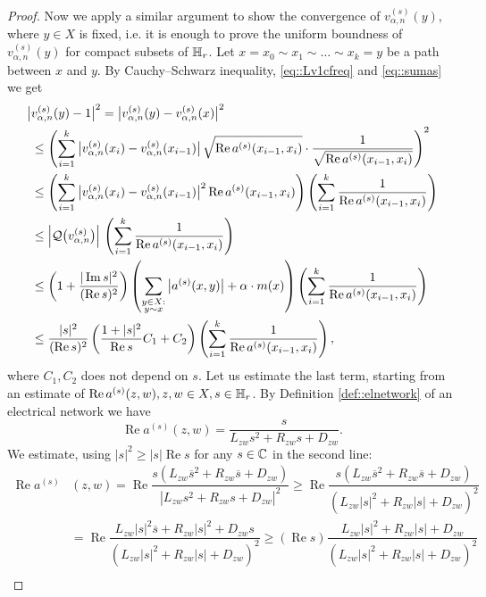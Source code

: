 \documentclass[a4paper,11pt]{amsart}
\theoremstyle{definition}
\renewcommand{\a}{a}%
\renewcommand{\Re}{\operatorname{Re}}%
\renewcommand{\Im}{\operatorname{Im}}%
\newcommand{\Q}{\mathcal{Q}}
\newcommand{\cfreq}{s}
\begin{document}
\begin{proof}
Now we  apply a similar argument to show the convergence of $v_{\alpha,n}^{(\cfreq)}(y)$, where $y\in X$ is fixed, i.e. it is enough to prove the uniform boundness of  $v_{\alpha,n}^{(\cfreq)}(y)$ for compact subsets of $\Bbb H_r$. Let $x=x_0\sim x_1\sim \dots \sim x_k=y$ be a path between $x$ and $y$. By Cauchy–Schwarz inequality,  \eqref{eq::Lv1cfreq}  and \eqref{eq::sumas} we get
\begin{align}\label{eq::estv}
\big|&v_{\alpha,n}^{(\cfreq)}(y)-1\big|^2=\big|v_{\alpha,n}^{(\cfreq)}(y)-v_{\alpha,n}^{(\cfreq)}(x)\big|^2\\
&\le
\left(
\sum_{i=1}^{k}
\big|v_{\alpha,n}^{(\cfreq)}(x_{i})-v_{\alpha,n}^{(\cfreq)}(x_{i-1})\big|
\,\sqrt{\Re\a^{(s)}(x_{i-1},x_i)}
\cdot
\frac{1}{\sqrt{\Re\a^{(s)}(x_{i-1},x_i)}}
\right)^2\notag \\
&\le \left(\sum_{i=1}^{k}
\big|v_{\alpha,n}^{(\cfreq)}(x_{i})-v_{\alpha,n}^{(\cfreq)}(x_{i-1})\big|^2
\Re\a^{(s)}(x_{i-1},x_i)\right)
\left (\sum_{i=1}^{k}\frac{1}{\Re\a^{(s)}(x_{i-1},x_i)}\right)\notag\\
&\le
\Big|\Q\big(v^{(\cfreq)}_{\alpha,n}\big)\Big|\,\left (\sum_{i=1}^{k}\frac{1}{\Re\a^{(s)}(x_{i-1},x_i)}\right)\notag\\
&\le \left(1+\dfrac{|\Im\cfreq|^2}{(\Re{\cfreq})^2}\right)\left(\sum_{\substack{y\in X:\\y\sim x}}\big|\a^{(\cfreq)}(x,y)\big|+\alpha\cdot m(x)\right)\left (\sum_{i=1}^{k}\frac{1}{\Re\a^{(s)}(x_{i-1},x_i)}\right)\notag\\
&\le \dfrac{|s|^2}{(\Re s)^2} \left(\frac{1 + |\cfreq|^2}{\Re \cfreq}C_1+C_2\right)\left (\sum_{i=1}^{k}\frac{1}{\Re\a^{(s)}(x_{i-1},x_i)}\right)\notag,
\end{align}
where $C_1, C_2$ does not depend on $s$. Let us estimate the last term, starting from an estimate of $\Re\a^{(s)}(z,w), z,w\in X, s\in \Bbb H_r$. By Definition \ref{def::elnetwork} of an electrical network we have
$$
\Re\a^{(s)}(z,w)=\dfrac{s}{L_{zw}s^2+R_{zw}s+D_{zw}}.
$$ 
We estimate, using $|s|^2\ge |s|\Re s$ for any $s\in \Bbb C$ in the second line:
\begin{align*}
\Re \a^{(s)}&(z,w)=\Re\dfrac{s(L_{zw}\overline s^2+R_{zw}\overline s+D_{zw})}{|L_{zw}s^2+R_{zw}s+D_{zw}|^2}\ge \Re\dfrac{s(L_{zw}\overline s^2+R_{zw}\overline s+D_{zw})}{(L_{zw}|s|^2+R_{zw}|s|+D_{zw})^2}\\
&=\Re\dfrac{L_{zw}|s|^2 \overline  s+R_{zw} |s|^2+D_{zw}s}{(L_{zw}|s|^2+R_{zw}|s|+D_{zw})^2}\ge (\Re s) \dfrac{L_{zw}|s|^2 +R_{zw} |s|+D_{zw}}{(L_{zw}|s|^2+R_{zw}|s|+D_{zw})^2}\\

\end{align*}
\end{proof}
\end{document}
